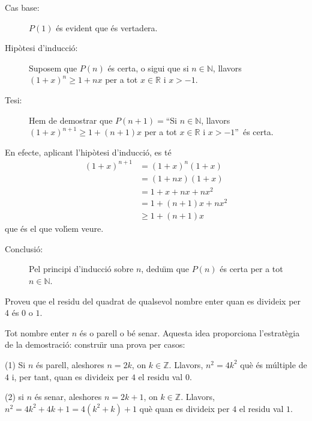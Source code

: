 \begin{solucio}
\begin{description}
\item[Cas base:] $P(1)$ \'{e}s evident que \'{e}s vertadera.

\item[Hip\`{o}tesi d'inducci\'{o}:] Suposem que $P(n)$ \'{e}s certa, o sigui
que si $n\in\mathbb{N}$, llavors $\left(  1+x\right)  ^{n}\geq1+nx$ per a tot
$x\in\mathbb{R}$ i $x>-1$.

\item[Tesi:] Hem de demostrar que $P(n+1)=$\textquotedblleft Si $n\in
\mathbb{N}$, llavors $\left(  1+x\right)  ^{n+1}\geq1+(n+1)x$ per a tot
$x\in\mathbb{R}$ i $x>-1$\textquotedblright\ \'{e}s certa.
\end{description}

En efecte, aplicant l'hip\`{o}tesi d'inducci\'{o}, es t\'{e}%
\begin{align*}
\left(  1+x\right)  ^{n+1}  &  =(1+x)^{n}(1+x)\\
&  =\left(  1+nx\right)  (1+x)\\
&  =1+x+nx+nx^{2}\\
&  =1+(n+1)x+nx^{2}\\
&  \geq1+(n+1)x
\end{align*}
que \'{e}s el que vol\'{\i}em veure.

\begin{description}
\item[Conclusi\'{o}:] Pel principi d'inducci\'{o} sobre $n$, dedu\"{\i}m que
$P(n)$ \'{e}s certa per a tot $n\in\mathbb{N}$.
\end{description}
\end{solucio}

\begin{exercici}
Proveu que el residu del quadrat de qualsevol nombre enter quan es divideix
per 4 \'{e}s $0$ o $1$.
\end{exercici}

\begin{solucio}
Tot nombre enter $n$ \'{e}s o parell o b\'{e} senar. Aquesta idea proporciona
l'estrat\`{e}gia de la demostraci\'{o}: constru\"{\i}r una prova per casos:

(1) Si $n$ \'{e}s parell, aleshores $n=2k$, on $k\in\mathbb{Z}$. Llavors,
$n^{2}=4k^{2}$ qu\`{e} \'{e}s m\'{u}ltiple de $4$ i, per tant, quan es
divideix per $4$ el residu val $0$.

(2) si $n$ \'{e}s senar, aleshores $n=2k+1$, on $k\in\mathbb{Z}$. Llavors,
$n^{2}=4k^{2}+4k+1=4\left(  k^{2}+k\right)  +1$ qu\`{e} quan es divideix per
$4$ el residu val $1$.
\end{solucio}


